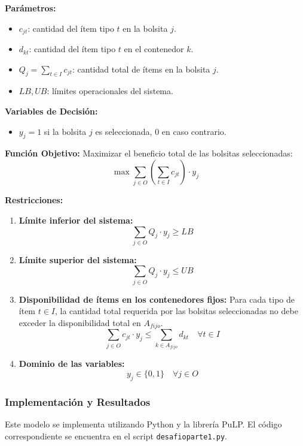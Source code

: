 \documentclass[a4paper,12pt]{article}
\begin{document}
\textbf{Parámetros:}
\begin{itemize}
    \item $c_{jt}$: cantidad del ítem tipo $t$ en la bolsita $j$.
    \item $d_{kt}$: cantidad del ítem tipo $t$ en el contenedor $k$.
    \item $Q_j = \sum_{t \in I} c_{jt}$: cantidad total de ítems en la bolsita $j$.
    \item $LB, UB$: límites operacionales del sistema.
\end{itemize}

\textbf{Variables de Decisión:}
\begin{itemize}
    \item $y_j = 1$ si la bolsita $j$ es seleccionada, $0$ en caso contrario.
\end{itemize}

\textbf{Función Objetivo:}
Maximizar el beneficio total de las bolsitas seleccionadas:
\[ \max \sum_{j \in O} \left(\sum_{t \in I} c_{jt}\right) \cdot y_j \]

\textbf{Restricciones:}
\begin{enumerate}
    \item \textbf{Límite inferior del sistema:}
    \[ \sum_{j \in O} Q_j \cdot y_j \ge LB \]
    \item \textbf{Límite superior del sistema:}
    \[ \sum_{j \in O} Q_j \cdot y_j \le UB \]
    \item \textbf{Disponibilidad de ítems en los contenedores fijos:} Para cada tipo de ítem $t \in I$, la cantidad total requerida por las bolsitas seleccionadas no debe exceder la disponibilidad total en $A_{fijo}$.
    \[ \sum_{j \in O} c_{jt} \cdot y_j \le \sum_{k \in A_{fijo}} d_{kt} \quad \forall t \in I \]
    \item \textbf{Dominio de las variables:}
    \[ y_j \in \{0, 1\} \quad \forall j \in O \]
\end{enumerate}

\subsubsection{Implementación y Resultados}
Este modelo se implementa utilizando Python y la librería PuLP. El código correspondiente se encuentra en el script \texttt{desafioparte1.py}.

\end{document}
